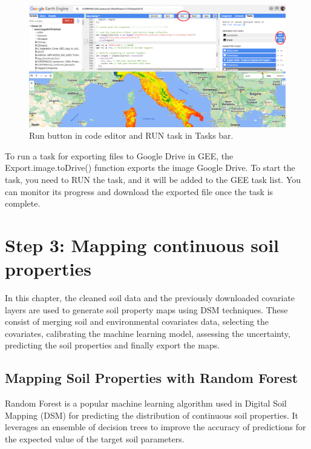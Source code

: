 \documentclass[
  10pt,
  b5paper,
  oneside]{book}
\begin{document}
\begin{figure}
\includegraphics[width=1\linewidth]{images/GEE_export} \caption{Run button in code editor and RUN task in Tasks bar.}\label{fig:RUN}
\end{figure}

To run a task for exporting files to Google Drive in GEE, the Export.image.toDrive() function exports the image Google Drive. To start the task, you need to RUN the task, and it will be added to the GEE task list. You can monitor its progress and download the exported file once the task is complete.

\hypertarget{step-3-mapping-continuous-soil-properties}{%
\chapter{Step 3: Mapping continuous soil properties}\label{step-3-mapping-continuous-soil-properties}}

In this chapter, the cleaned soil data and the previously downloaded covariate layers are used to generate soil property maps using DSM techniques. These consist of merging soil and environmental covariates data, selecting the covariates, calibrating the machine learning model, assessing the uncertainty, predicting the soil properties and finally export the maps.

\hypertarget{mapping-soil-properties-with-random-forest}{%
\section{Mapping Soil Properties with Random Forest}\label{mapping-soil-properties-with-random-forest}}

Random Forest is a popular machine learning algorithm used in Digital Soil Mapping (DSM) for predicting the distribution of continuous soil properties. It leverages an ensemble of decision trees to improve the accuracy of predictions for the expected value of the target soil parameters.
\end{document}
